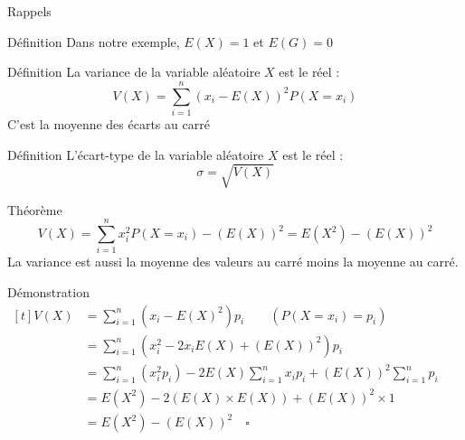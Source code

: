 \documentclass{cours}
\begin{document}
\begin{Gpartie}{Rappels}
\begin{Spartie}{Définition}
            Dans notre exemple, $E(X)=1$ et $E(G)=0$
        \end{Spartie}
        \begin{Spartie}{Définition} 
            La variance de la variable aléatoire $X$ est le réel : \[V(X)=\sum_{i=1}^n\left(x_i-E(X)\right)^2P(X=x_i)\]
            C'est la moyenne des écarts au carré
        \end{Spartie}
        \begin{Spartie}{Définition} 
            L'écart-type de la variable aléatoire $X$ est le réel : \[\sigma=\sqrt{V(X)}\]
        \end{Spartie}
        \begin{Spartie}{Théorème} 
            \[V(X)=\sum_{i=1}^nx_i^2P(X=x_i)-\left(E(X)\right)^2=E\left(X^2\right)-\left(E(X)\right)^2\]
            La variance est aussi la moyenne des valeurs au carré moins la moyenne au carré.
            \begin{SSpartie}{Démonstration} 
                $\begin{aligned}[t]
                    V(X)&=\sum_{i=1}^n\left(x_i-E(X)^2\right)p_i\qquad\left(P(X=x_i)=p_i\right) \\
                    &=\sum_{i=1}^n\left(x_i^2-2x_iE(X)+\left(E(X)\right)^2\right)p_i \\
                    &=\sum_{i=1}^n\left(x_i^2p_i\right)-2E(X)\sum_{i=1}^n x_i p_i+\left(E(X)\right)^2\sum_{i=1}^np_i \\
                    &=E\left(X^2\right)-2\left(E(X)\times E(X)\right)+\left(E(X)\right)^2\times 1 \\
                    &=E\left(X^2\right)-\left(E(X)\right)^2\quad\square
                \end{aligned}$
            \end{SSpartie}
        \end{Spartie}
    \end{Gpartie}
    \pagebreak
\end{document}
